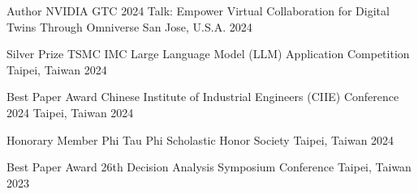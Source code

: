 



\begin{cvhonors}

  \cvhonor
    {Author} %
    {NVIDIA GTC 2024 Talk: Empower Virtual Collaboration for Digital Twins Through Omniverse} %
    {San Jose, U.S.A.} %
    {2024} %

\end{cvhonors}




\begin{cvhonors}

  \cvhonor
    {Silver Prize} %
    {TSMC IMC Large Language Model (LLM) Application Competition} %
    {Taipei, Taiwan} %
    {2024} %

  \cvhonor
    {Best Paper Award} %
    {Chinese Institute of Industrial Engineers (CIIE) Conference 2024} %
    {Taipei, Taiwan} %
    {2024} %
    
  \cvhonor
    {Honorary Member} %
    {Phi Tau Phi Scholastic Honor Society} %
    {Taipei, Taiwan} %
    {2024} %

  \cvhonor
    {Best Paper Award} %
    {26th Decision Analysis Symposium Conference} %
    {Taipei, Taiwan} %
    {2023} %

\end{cvhonors}
